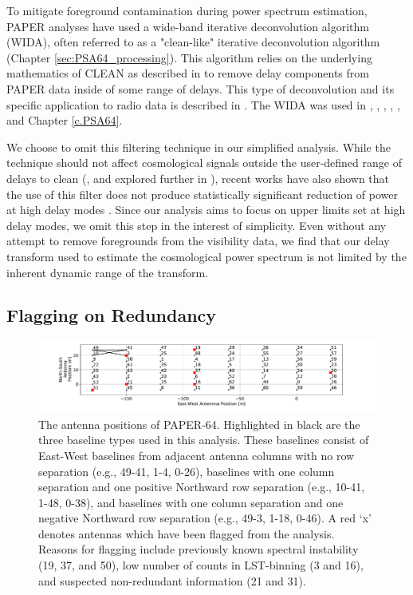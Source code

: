 To mitigate foreground contamination during
power spectrum estimation, PAPER analyses have used
a wide-band iterative deconvolution algorithm (WIDA),
often referred to as a "clean-like" iterative
deconvolution algorithm (Chapter \ref{sec:PSA64_processing}). This algorithm relies on the
underlying mathematics of CLEAN as described in
\citet{hogbom1974} to remove delay components from
PAPER data inside of some range of delays.
This type of deconvolution and its specific
application to radio data is described in \citet{parsons_backer2009}.
The WIDA was used in \citet{parsons_et_al2012b}, \citet{parsons_et_al2014}, \citet{jacobs_et_al2015}, , \citet{kerrigan_et_al2018}, and Chapter \ref{c.PSA64}.

We choose to omit this filtering technique in our simplified analysis. While the technique should not
affect cosmological signals outside the user-defined
range of delays to clean (\citealt{parsons_backer2009, parsons_et_al2012b, parsons_et_al2014}, and explored further in \citealt{kerrigan_et_al2018}),
recent works have also shown that the use of this filter does not produce
statistically significant reduction of power at
high delay modes \citep{kerrigan_et_al2018}.
Since our analysis aims to focus on upper limits set
at high delay modes, we omit this step in the interest
of simplicity. Even without any attempt to remove foregrounds from the
visibility data, we find that our delay transform used to estimate
the cosmological power spectrum is not limited by the inherent
dynamic range of the transform.

\subsection{Flagging on Redundancy}
\label{sec:redundancy}

\begin{figure}[tp]
\centering
\includegraphics[trim={3cm 0  4cm 0},width=\textwidth]{plots/psa64_antpos_flagged.pdf}
\caption{The antenna positions of PAPER-64.
Highlighted in black are the three baseline types used in this analysis.
These baselines consist of East-West baselines from adjacent
antenna columns with no row separation
(e.g., 49-41, 1-4, 0-26),
baselines with one column separation and one positive Northward
row separation (e.g., 10-41, 1-48, 0-38),
and baselines with one column separation
and one negative Northward row separation
(e.g., 49-3, 1-18, 0-46). A red `x' denotes antennas which have been flagged from the analysis. Reasons for
flagging include previously known spectral instability (19, 37, and 50), low number of counts in LST-binning (3 and 16), and suspected non-redundant information (21 and 31).} \label{fig:ant_pos}
\end{figure}


